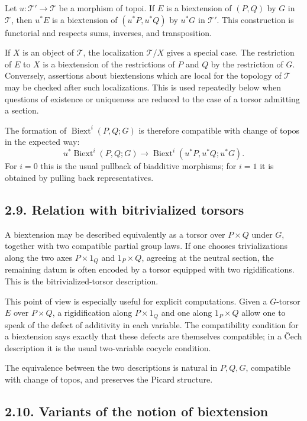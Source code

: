 \documentclass[11pt]{article}
\newcommand{\Biext}{\operatorname{Biext}}
\newcommand{\cT}{\mathcal T}
\begin{document}
Let \(u:\cT'\to\cT\) be a morphism of topoi. If \(E\) is a biextension of
\((P,Q)\) by \(G\) in \(\cT\), then \(u^*E\) is a biextension of
\((u^*P,u^*Q)\) by \(u^*G\) in \(\cT'\). This construction is functorial and
respects sums, inverses, and transposition.

If \(X\) is an object of \(\cT\), the localization \(\cT/X\) gives a special
case. The restriction of \(E\) to \(X\) is a biextension of the restrictions of
\(P\) and \(Q\) by the restriction of \(G\). Conversely, assertions about
biextensions which are local for the topology of \(\cT\) may be checked after
such localizations. This is used repeatedly below when questions of existence or
uniqueness are reduced to the case of a torsor admitting a section.

The formation of \(\Biext^i(P,Q;G)\) is therefore compatible with change of
topos in the expected way:
\[
u^*\Biext^i(P,Q;G)\longrightarrow
\Biext^i(u^*P,u^*Q;u^*G).
\]
For \(i=0\) this is the usual pullback of biadditive morphisms; for \(i=1\) it is
obtained by pulling back representatives.

\subsection*{2.9. Relation with bitrivialized torsors}

A biextension may be described equivalently as a torsor over \(P\times Q\) under
\(G\), together with two compatible partial group laws. If one chooses
trivializations along the two axes \(P\times 1_Q\) and \(1_P\times Q\), agreeing
at the neutral section, the remaining datum is often encoded by a torsor equipped
with two rigidifications. This is the bitrivialized-torsor description.

This point of view is especially useful for explicit computations. Given a
\(G\)-torsor \(E\) over \(P\times Q\), a rigidification along \(P\times 1_Q\)
and one along \(1_P\times Q\) allow one to speak of the defect of additivity in
each variable. The compatibility condition for a biextension says exactly that
these defects are themselves compatible; in a Čech description it is the usual
two-variable cocycle condition.

The equivalence between the two descriptions is natural in \(P,Q,G\), compatible
with change of topos, and preserves the Picard structure.

\subsection*{2.10. Variants of the notion of biextension}
\end{document}
